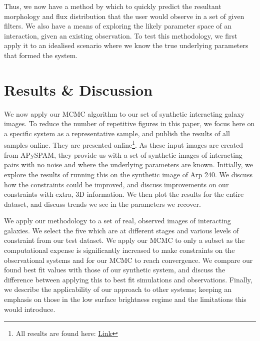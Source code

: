 Thus, we now have a method by which to quickly predict the resultant morphology and flux distribution that the user would observe in a set of given filters. We also have a means of exploring the likely parameter space of an interaction, given an existing observation. To test this methodology, we first apply it to an idealised scenario where we know the true underlying parameters that formed the system.


\section{Results \& Discussion}\label{Results}
\noindent We now apply our MCMC algorithm to our set of synthetic interacting galaxy images. To reduce the number of repetitive figures in this paper, we focus here on a specific system as a representative sample, and publish the results of all samples online. They are presented online\footnote{All results are found here: \href{https://drive.google.com/drive/folders/1hlFhrdoZ50JaEWWYoy0RZ3J4LSoRjmsq?usp=sharing}{Link}}. As these input images are created from APySPAM, they provide us with a set of synthetic images of interacting pairs with no noise and where the underlying parameters are known. Initially, we explore the results of running this on the synthetic image of Arp 240. We discuss how the constraints could be improved, and discuss improvements on our constraints with extra, 3D information. We then plot the results for the entire dataset, and discuss trends we see in the parameters we recover.

We apply our methodology to a set of real, observed images of interacting galaxies. We select the five which are at different stages and various levels of constraint from our test dataset. We apply our MCMC to only a subset as the computational expense is significantly increased to make constraints on the observational systems and for our MCMC to reach convergence. We compare our found best fit values with those of our synthetic system, and discuss the difference between applying this to best fit simulations and observations. Finally, we describe the applicability of our approach to other systems; keeping an emphasis on those in the low surface brightness regime and the limitations this would introduce.

